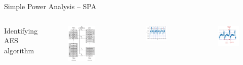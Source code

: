\documentclass[handout]{beamer}
\begin{document}
\begin{frame}{Simple Power Analysis -- SPA}

\begin{columns}


\footnotesize
Identifying AES algorithm

\begin{figure}
\includegraphics[width=140pt]{figures/aes-algorithm.png}
\end{figure}



\begin{figure}
\includegraphics[width=110pt]{figures/aes-spa-trace.png}
\end{figure}

\begin{figure}
\includegraphics[width=110pt]{figures/aes-spa-trace-zoomed.png}
\end{figure}

\end{columns}

\end{frame}
\end{document}
